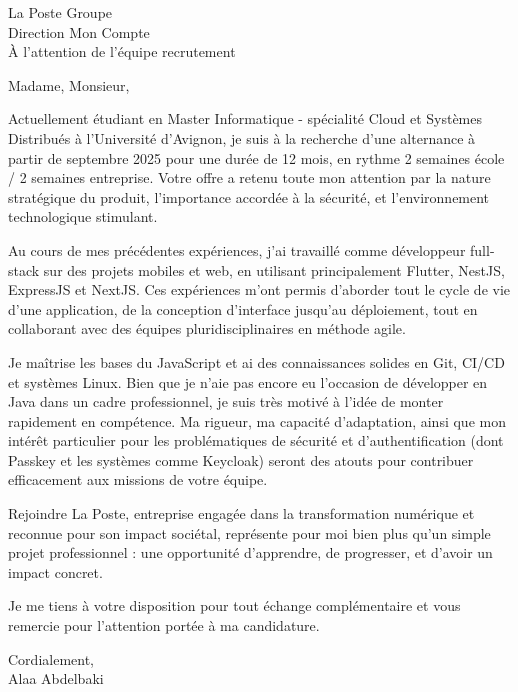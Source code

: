 \documentclass[11pt,a4paper]{letter}
\date{\today}
\begin{document}
\begin{letter}{La Poste Groupe\\Direction Mon Compte\\À l'attention de l'équipe recrutement}

    \opening{Madame, Monsieur,}

    Actuellement étudiant en Master Informatique - spécialité Cloud et Systèmes Distribués à l'Université d'Avignon, je suis à la recherche d'une alternance à partir de septembre 2025 pour une durée de 12 mois, en rythme 2 semaines école / 2 semaines entreprise. Votre offre a retenu toute mon attention par la nature stratégique du produit, l'importance accordée à la sécurité, et l'environnement technologique stimulant.

    Au cours de mes précédentes expériences, j'ai travaillé comme développeur full-stack sur des projets mobiles et web, en utilisant principalement Flutter, NestJS, ExpressJS et NextJS. Ces expériences m'ont permis d'aborder tout le cycle de vie d'une application, de la conception d'interface jusqu'au déploiement, tout en collaborant avec des équipes pluridisciplinaires en méthode agile.

    Je maîtrise les bases du JavaScript et ai des connaissances solides en Git, CI/CD et systèmes Linux. Bien que je n'aie pas encore eu l'occasion de développer en Java dans un cadre professionnel, je suis très motivé à l'idée de monter rapidement en compétence. Ma rigueur, ma capacité d'adaptation, ainsi que mon intérêt particulier pour les problématiques de sécurité et d'authentification (dont Passkey et les systèmes comme Keycloak) seront des atouts pour contribuer efficacement aux missions de votre équipe.

    Rejoindre La Poste, entreprise engagée dans la transformation numérique et reconnue pour son impact sociétal, représente pour moi bien plus qu'un simple projet professionnel : une opportunité d'apprendre, de progresser, et d'avoir un impact concret.

    Je me tiens à votre disposition pour tout échange complémentaire et vous remercie pour l'attention portée à ma candidature.

    \vspace{2cm}
    \noindent\hfill Cordialement,\\[1em]
    \raggedleft
    \noindent\hfill Alaa Abdelbaki

\end{letter}
\end{document}
